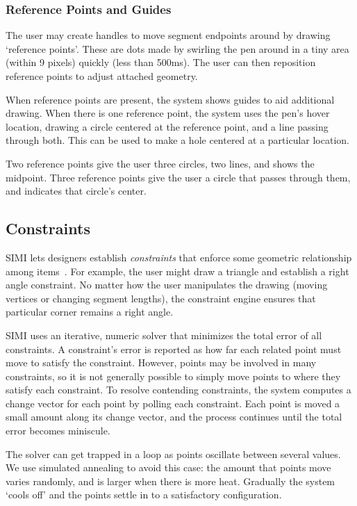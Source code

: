 \documentclass{article}
\begin{document}
\subsubsection{Reference Points and Guides}

The user may create handles to move segment endpoints around by
drawing `reference points'. These are dots made by swirling the pen
around in a tiny area (within 9 pixels) quickly (less than 500ms). The
user can then reposition reference points to adjust attached geometry.

When reference points are present, the system shows guides to aid
additional drawing. When there is one reference point, the system uses
the pen's hover location, drawing a circle centered at the reference
point, and a line passing through both. This can be used to make a
hole centered at a particular location.

Two reference points give the user three circles, two lines, and shows
the midpoint. Three reference points give the user a circle that
passes through them, and indicates that circle's center.

\subsection{Constraints}

SIMI lets designers establish \textit{constraints} that enforce some
geometric relationship among items~\cite{borning-thinglab}. For
example, the user might draw a triangle and establish a right angle
constraint. No matter how the user manipulates the drawing (moving
vertices or changing segment lengths), the constraint engine ensures
that particular corner remains a right angle.

SIMI uses an iterative, numeric solver that minimizes the total error
of all constraints. A constraint's error is reported as how far each
related point must move to satisfy the constraint. However, points may
be involved in many constraints, so it is not generally possible to
simply move points to where they satisfy each constraint. To resolve
contending constraints, the system computes a change vector for each
point by polling each constraint. Each point is moved a small amount
along its change vector, and the process continues until the total
error becomes miniscule.

The solver can get trapped in a loop as points oscillate between
several values. We use simulated annealing to avoid this case: the
amount that points move varies randomly, and is larger when there is
more heat. Gradually the system `cools off' and the points settle in
to a satisfactory configuration.
\end{document}
